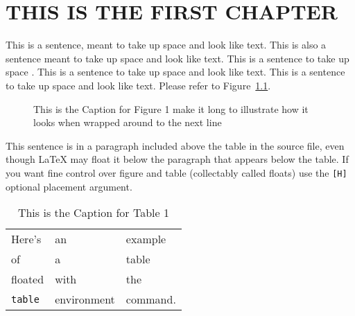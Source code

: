  
\chapter{THIS IS THE FIRST CHAPTER}
 
This is a sentence, meant to take up space and look like text.  This
is also a sentence meant to take up space and look like text.  This is
a sentence to take up space \cite{thisbook}. This is a sentence to
take up space and look like text.  This is a sentence to take up space
and look like text.
Please refer to Figure~\ref{myfig}.  %

\begin{figure}
\centering
\vspace{2.0in} %
\caption{This is the Caption for Figure 1 make it long to illustrate
how it looks when wrapped around to the next line}
\label{myfig}  %
\end{figure}

This sentence is in a paragraph included above the table in the source
file, even though {\LaTeX} may float it below the paragraph that appears below the table.
If you want fine control over figure and table (collectably
called floats) use the \verb+[H]+ optional placement argument.
 
\begin{table}%
\caption[This is the Caption for Table 1]
            {This is the Caption for Table 1\cite{thisbook}}
\begin{center}
\begin{tabular}{lll}
Here's       & an          & example  \\
of           & a           & table    \\
floated      & with        & the      \\
\verb+table+ & environment & command.
\end{tabular}
\end{center}
\end{table}
 
